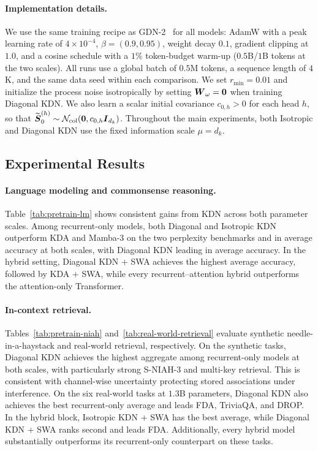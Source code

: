 \documentclass[11pt,letterpaper,logo]{yalearxiv}
\begin{document}
\paragraph{Implementation details.}
We use the same training recipe as GDN-2~\citep{hatamizadeh2026gdn2} for all models: AdamW with a
peak learning rate of $4\times10^{-4}$, $\beta=(0.9,0.95)$, weight decay $0.1$, gradient clipping
at $1.0$, and a cosine schedule with a $1\%$ token-budget warm-up ($0.5$B/$1$B tokens at
the two scales). All runs use a global
batch of $0.5$M tokens, a sequence length of $4$K, and the same data seed within each comparison.
We set $r_{\min}=0.01$ and initialize the process noise isotropically by setting
$\boldsymbol{W}_{\omega}=\boldsymbol{0}$ when training Diagonal KDN. We also learn a scalar initial covariance
$c_{0,h}>0$ for each head $h$, so that
$\widetilde{\boldsymbol{S}}_0^{(h)}\sim\mathcal N_{\mathrm{col}}(\boldsymbol{0},c_{0,h}\boldsymbol{I}_{d_k})$.
Throughout the main experiments, both Isotropic and Diagonal KDN use the fixed information scale
$\mu=d_k$.
\subsection{Experimental Results}
\label{sec:experimental-results}

\paragraph{Language modeling and commonsense reasoning.}
Table~\ref{tab:pretrain-lm} shows consistent gains from KDN across both parameter scales. Among
recurrent-only models, both Diagonal and Isotropic KDN outperform KDA and Mamba-3 on the two
perplexity benchmarks and in average accuracy at both scales, with Diagonal KDN leading in average
accuracy. In the hybrid setting, Diagonal KDN $+$ SWA achieves the highest average accuracy,
followed by KDA $+$ SWA, while every recurrent--attention hybrid outperforms the attention-only
Transformer.

\paragraph{In-context retrieval.}
Tables~\ref{tab:pretrain-niah} and~\ref{tab:real-world-retrieval} evaluate synthetic
needle-in-a-haystack and real-world retrieval, respectively. On the synthetic tasks, Diagonal KDN
achieves the highest aggregate among recurrent-only models at both scales, with particularly strong
S-NIAH-3 and multi-key retrieval. This is consistent with channel-wise uncertainty protecting stored
associations under interference. On the six real-world tasks at $1.3$B parameters, Diagonal KDN
also achieves the best recurrent-only average and leads FDA, TriviaQA, and DROP. In the hybrid block,
Isotropic KDN $+$ SWA has the best average, while Diagonal KDN $+$ SWA ranks second and leads FDA.
Additionally, every hybrid model substantially outperforms its recurrent-only counterpart on these
tasks.
\end{document}
